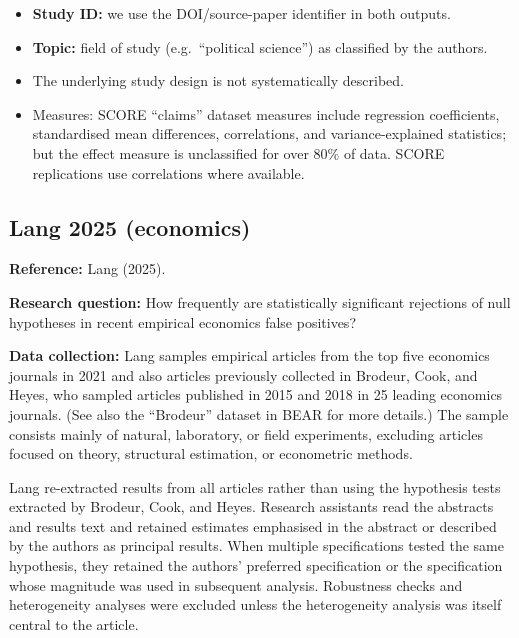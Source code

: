\documentclass[
  11pt,
]{article}
\providecommand{\tightlist}{%
  \setlength{\itemsep}{0pt}\setlength{\parskip}{0pt}}
\begin{document}
\begin{itemize}
\tightlist
\item
  \textbf{Study ID:} we use the DOI/source-paper identifier in both
  outputs.
\item
  \textbf{Topic:} field of study (e.g.~``political science'') as
  classified by the authors.
\item
  The underlying study design is not systematically described.
\item
  Measures: SCORE ``claims'' dataset measures include regression
  coefficients, standardised mean differences, correlations, and
  variance-explained statistics; but the effect measure is unclassified
  for over 80\% of data. SCORE replications use correlations where
  available.
\end{itemize}

\newpage

\subsection{Lang 2025 (economics)}\label{lang-2025-economics}

\textbf{Reference:} Lang (2025).

\textbf{Research question:} How frequently are statistically significant
rejections of null hypotheses in recent empirical economics false
positives?

\textbf{Data collection:} Lang samples empirical articles from the top
five economics journals in 2021 and also articles previously collected
in Brodeur, Cook, and Heyes, who sampled articles published in 2015 and
2018 in 25 leading economics journals. (See also the ``Brodeur'' dataset
in BEAR for more details.) The sample consists mainly of natural,
laboratory, or field experiments, excluding articles focused on theory,
structural estimation, or econometric methods.

Lang re-extracted results from all articles rather than using the
hypothesis tests extracted by Brodeur, Cook, and Heyes. Research
assistants read the abstracts and results text and retained estimates
emphasised in the abstract or described by the authors as principal
results. When multiple specifications tested the same hypothesis, they
retained the authors' preferred specification or the specification whose
magnitude was used in subsequent analysis. Robustness checks and
heterogeneity analyses were excluded unless the heterogeneity analysis
was itself central to the article.
\end{document}
